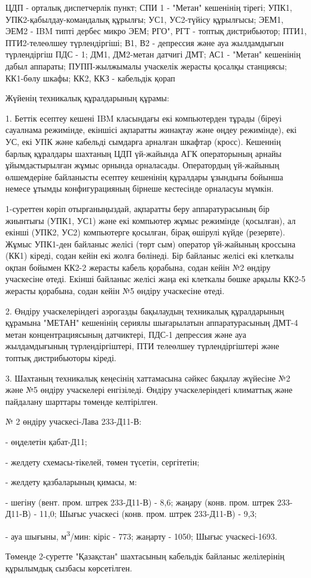 \begin{multicols}{2}
ЦДП - орталық диспетчерлік пункт; СПИ 1 - "Метан" кешенінің тірегі;
УПК1, УПК2-қабылдау-командалық құрылғы; УС1, УС2-түйісу құрылғысы; ЭЕМ1,
ЭЕМ2 - IBM типті дербес микро ЭЕМ; РГО", РГТ - топтық дистрибьютор;
ПТИ1, ПТИ2-телеөлшеу түрлендіргіші; В1, В2 - депрессия және ауа
жылдамдығын түрлендіргіш ПДС - 1; ДМ1, ДМ2-метан датчигі ДМТ; АС1 -
"Метан" кешенінің дабыл аппараты; ПУПП-жылжымалы учаскелік жерасты
қосалқы станциясы; КК1-бөлу шкафы; КК2, ККЗ - кабельдік қорап

Жүйенің техникалық құралдарының құрамы:

1. Беттік есептеу кешені IBM класындағы екі компьютерден тұрады (біреуі
сауалнама режимінде, екіншісі ақпаратты жинақтау және өңдеу режимінде),
екі УС, екі УПК және кабельді сымдарға арналған шкафтар (кросс).
Кешеннің барлық құралдары шахтаның ЦДП үй-жайында АГК операторының
арнайы ұйымдастырылған жұмыс орнында орналасады. Оператордың үй-жайының
өлшемдеріне байланысты есептеу кешенінің құралдары ұзындығы бойынша
немесе ұтымды конфигурацияның бірнеше кестесінде орналасуы мүмкін.

1-суреттен көріп отырғаныңыздай, ақпаратты беру аппаратурасының бір
жиынтығы (УПК1, УС1) және екі компьютер жұмыс режимінде (қосылған), ал
екінші (УПК2, УС2) компьютерге қосылған, бірақ өшірулі күйде (резервте).
Жұмыс УПК1-ден байланыс желісі (төрт сым) оператор үй-жайының кроссына
(КК1) кіреді, содан кейін екі жолға бөлінеді. Бір байланыс желісі екі
клеткалы оқпан бойымен КК2-2 жерасты кабель қорабына, содан кейін №2
өндіру учаскесіне өтеді. Екінші байланыс желісі жаңа екі клеткалы бөшке
арқылы КК2-5 жерасты қорабына, содан кейін №5 өндіру учаскесіне өтеді.

2. Өндіру учаскелеріндегі аэрогазды бақылаудың техникалық құралдарының
құрамына "МЕТАН" кешенінің сериялы шығарылатын аппаратурасының ДМТ-4
метан концентрациясының датчиктері, ПДС-1 депрессия және ауа
жылдамдығының түрлендіргіштері, ПТИ телеөлшеу түрлендіргіштері және
топтық дистрибьюторы кіреді.

3. Шахтаның техникалық кеңесінің хаттамасына сәйкес бақылау жүйесіне №2
және №5 өндіру учаскелері енгізіледі. Өндіру учаскелеріндегі климаттық
және пайдалану шарттары төменде келтірілген.

№ 2 өндіру учаскесі-Лава 233-Д11-В:

- өңделетін қабат-Д11;

- желдету схемасы-тікелей, төмен түсетін, сергітетін;

- желдету қазбаларының қимасы, м:

- шегіну (вент. пром. штрек 233-Д11-В) - 8,6; жаңару (конв. пром. штрек
233-Д11-В) - 11,0; Шығыс учаскесі (конв. пром. штрек 233-Д11-В) - 9,3;

- ауа шығыны, м\textsuperscript{3}/мин: кіріс - 773; жаңарту - 1050;
Шығыс учаскесі-1693.

Төменде 2-суретте "Қазақстан" шахтасының кабельдік байланыс желілерінің
құрылымдық сызбасы көрсетілген.
\end{multicols}

